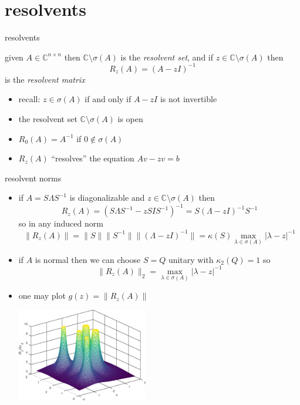 \documentclass[10pt,hyperref]{beamer}
\newcommand{\CC}{\mathbb{C}}
\begin{document}
\section{resolvents}

\begin{frame}{resolvents}

\begin{definition}
given $A\in\CC^{n\times n}$ then $\CC\setminus \sigma(A)$ is the \emph{resolvent set}, and if $z \in \CC\setminus \sigma(A)$ then
    $$R_z(A) = \left(A-z I\right)^{-1}$$
is the \emph{resolvent matrix}
\end{definition}

\begin{itemize}
\item recall: $z \in \sigma(A)$ if and only if $A-z I$ is not invertible
\item the resolvent set $\CC\setminus \sigma(A)$ is open
\item $R_0(A)=A^{-1}$ if $0\notin\sigma(A)$
\item $R_z(A)$ ``resolves'' the equation $Av-z v=b$
\end{itemize}
\end{frame}


\begin{frame}{resolvent norms}

\begin{itemize}
\item if $A=S\Lambda S^{-1}$ is diagonalizable and $z\in \CC\setminus \sigma(A)$ then
    $$R_z(A) = \left(S\Lambda S^{-1}-z S I S^{-1}\right)^{-1} = S \left(\Lambda - z I\right)^{-1} S^{-1}$$
so in any induced norm
    $$\|R_z(A)\| = \|S\|\|S^{-1}\|\|\left(\Lambda - z I\right)^{-1}\| = \kappa(S) \max_{\lambda\in\sigma(A)} |\lambda-z|^{-1}$$
\item if $A$ is normal then we can choose $S=Q$ unitary with $\kappa_2(Q)=1$ so
    $$\|R_z(A)\|_2 = \max_{\lambda\in\sigma(A)} |\lambda-z|^{-1}$$
\item one may plot $g(z)=\|R_z(A)\|$

\vspace{-5mm}
\hfill \includegraphics[width=0.45\textwidth]{figs/resolvesurf}
\end{itemize}
\end{frame}
\end{document}
